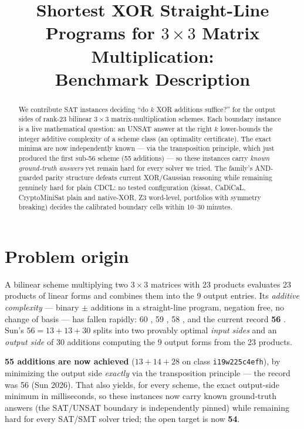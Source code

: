 \documentclass[conference]{IEEEtran}
\title{Shortest XOR Straight-Line Programs for $3\times 3$ Matrix
  Multiplication:\\ Benchmark Description}
\author{\IEEEauthorblockN{Greg Sidebottom}%
\IEEEauthorblockA{logic repository,
\url{https://github.com/gsidebottom/logic}}}
\begin{document}
\maketitle

\begin{abstract}
We contribute SAT instances deciding ``do $k$ XOR additions
suffice?'' for the output sides of rank-23 bilinear $3\times 3$
matrix-multiplication schemes. Each boundary instance is a live
mathematical question: an UNSAT answer at the right $k$ lower-bounds
the integer additive complexity of a scheme class (an optimality
certificate). The exact minima are now independently known --- via the
transposition principle, which just produced the first sub-56 scheme
(55 additions) --- so these instances carry \emph{known ground-truth
answers} yet remain hard for every solver we tried. The family's
AND-guarded parity structure defeats current
XOR/Gaussian reasoning while remaining genuinely hard for plain
CDCL: no tested configuration (kissat, CaDiCaL, CryptoMiniSat plain
and native-XOR, Z3 word-level, portfolios with symmetry breaking)
decides the calibrated boundary cells within 10--30 minutes.
\end{abstract}

\section{Problem origin}

A bilinear scheme multiplying two $3\times 3$ matrices with 23
products \cite{laderman} evaluates 23 products of linear forms and
combines them into the 9 output entries. Its \emph{additive
complexity} --- binary $\pm$ additions in a straight-line program,
negation free, no change of basis --- has fallen rapidly: 60
\cite{stapleton}, 59 \cite{mws}, 58 \cite{perminov}, and the current
record \textbf{56} \cite{sun}. Sun's $56 = 13 + 13 + 30$ splits into
two provably optimal \emph{input sides} and an \emph{output side} of
30 additions computing the 9 output forms from the 23 products.

\textbf{55 additions are now achieved} ($13{+}14{+}28$ on class
\texttt{i19w225c4efh}), by minimizing the output side \emph{exactly}
via the transposition principle --- the record was 56 (Sun 2026). That
also yields, for every scheme, the exact output-side minimum in
milliseconds, so these instances now carry known ground-truth answers
(the SAT/UNSAT boundary is independently pinned) while remaining hard
for every SAT/SMT solver tried; the open target is now \textbf{54}.
\end{document}
